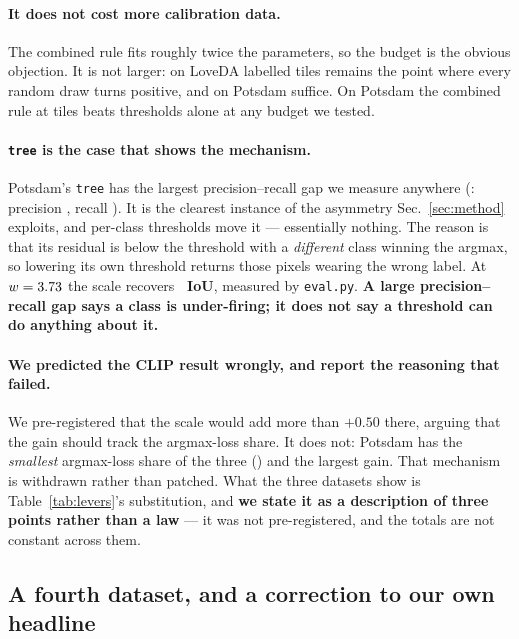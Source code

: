 \documentclass[10pt,a4paper]{article}                        %
\newcommand{\best}[1]{\textbf{#1}}
\begin{document}
\paragraph{It does not cost more calibration data.} The combined rule fits roughly
twice the parameters, so the budget is the obvious objection. It is not larger: on
LoveDA \calibTiles{} labelled tiles remains the point where every random draw turns
positive, and on Potsdam \scCalibPots{} suffice. On Potsdam the combined rule at
\scCalibPots{} tiles beats thresholds alone at any budget we tested.

\paragraph{\texttt{tree} is the case that shows the mechanism.} Potsdam's
\texttt{tree} has the largest precision--recall gap we measure anywhere
(\treeGap{}: precision \treeP{}, recall \treeR{}). It is the clearest instance of
the asymmetry Sec.~\ref{sec:method} exploits, and per-class thresholds move it
\treeTau{} --- essentially nothing. The reason is that its residual is below the
threshold with a \emph{different} class winning the argmax, so lowering its own
threshold returns those pixels wearing the wrong label. At $w = 3.73{}$ the scale
recovers \best{\treeScale{}~IoU}, measured by \texttt{eval.py}. \best{A large
precision--recall gap says a class is under-firing; it does not say a threshold can
do anything about it.}

\paragraph{We predicted the CLIP result wrongly, and report the reasoning that
failed.} We pre-registered that the scale would add more than $+0.50$ there, arguing
that the gain should track the argmax-loss share. It does not: Potsdam has the
\emph{smallest} argmax-loss share of the three (\mechBpots{}) and the largest gain.
That mechanism is withdrawn rather than patched. What the three datasets show is
Table~\ref{tab:levers}'s substitution, and \best{we state it as a description of
three points rather than a law} --- it was not pre-registered, and the totals are not
constant across them.

\subsection{A fourth dataset, and a correction to our own headline}
\label{sec:uavid}
\end{document}

